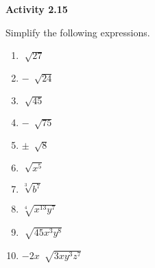 \vspace{0.3ex}
\noindent\textbf{Activity 2.15}

\vspace{0.2ex}


Simplify the following expressions.
\begin{multicols}{2}
\begin{enumerate}[noitemsep, label = \color{blue}\arabic*. ]
\item $\sqrt[]{27}$
\item $-~\sqrt[]{24}$
\item $\sqrt[]{45}$
\item $-~\sqrt[]{75}$
\item $\pm~\sqrt[]{8}$
\item $\sqrt[]{x^{5}}$
\item $\sqrt[{\scriptstyle 3}]{b^{7}}$
\item $\sqrt[{\scriptstyle 4}]{x^{13}y^{7}}$
\item $\sqrt[]{45 x^{3}y^{8}}$
  \item $-2x~\sqrt[]{3x y^{3}z^{7}}$
\end{enumerate}
\end{multicols}
